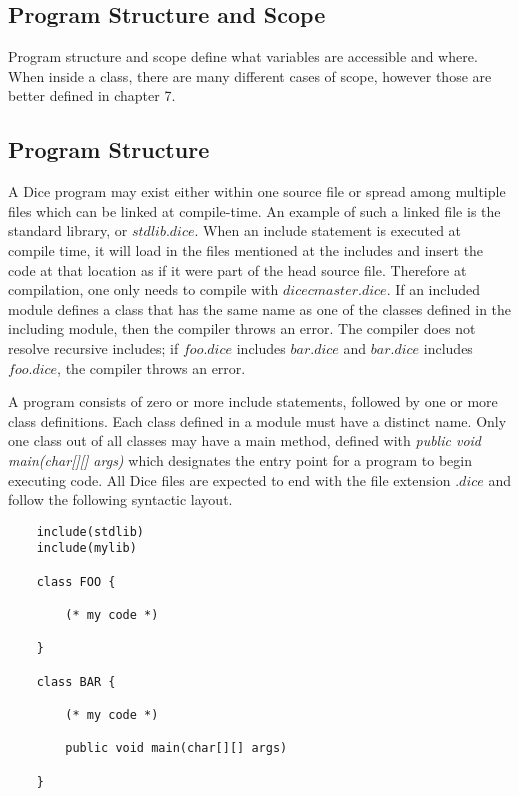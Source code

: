 \begin{homeworkProblem}
	\section{Program Structure and Scope}
	
	Program structure and scope define what variables are accessible and where. When inside a class, there are many different cases of scope, however those are better defined in chapter 7. 
	
	\subsection{Program Structure}
		
	A Dice program may exist either within one source file or spread among multiple files which can be linked at compile-time. An example of such a linked file is the standard library, or $stdlib.dice$. When an include statement is executed at compile time, it will load in the files mentioned at the includes and insert the code at that location as if it were part of the head source file. Therefore at compilation, one only needs to compile with $dicec master.dice$. If an included module defines a class that has the same name as one of the classes defined in the including module, then the compiler throws an error. The compiler does not resolve recursive includes; if $foo.dice$ includes $bar.dice$ and $bar.dice$ includes $foo.dice$, the compiler throws an error.

	A program consists of zero or more include statements, followed by one or more class definitions. Each class defined in a module must have a distinct name. Only one class out of all classes may have a main method, defined with \textit{public void main(char[][] args)} which designates the entry point for a program to begin executing code. All Dice files are expected to end with the file extension $.dice$ and follow the following syntactic layout. 
	
	\begin{verbatim}
	include(stdlib)
	include(mylib)
	
	class FOO {
	
		(* my code *)
	
	}
	
	class BAR {
	
		(* my code *)
		
		public void main(char[][] args)
	
	}
	\end{verbatim}


\end{homeworkProblem}
